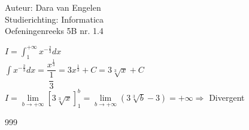 \documentclass[a4paper]{article}
\begin{document}
	
\noindent \large Auteur: Dara van Engelen     \\
\noindent \large Studierichting: Informatica \\
\noindent \large Oefeningenreeks 5B nr. 1.4  \\
	
\medskip
	
\normalsize
	
$ I = \displaystyle\int_1^{+\infty} x^{-\tfrac{2}{3}} dx $\\
	
$\displaystyle\int x^{-\tfrac{2}{3}}dx = \dfrac{x^{\tfrac{1}{3}}}{\dfrac{1}{3}} = 3x^{\tfrac{1}{3}} + C = 3\sqrt[3]{x} + C$\\

	
$ I = \lim\limits_{b\rightarrow +\infty} \left[ 3\sqrt[3]{x} \right]_1^b = \lim\limits_{b\rightarrow +\infty} \left( 3\sqrt[3]{b} -3\right) = +\infty \Rightarrow$ Divergent\\
	
\begin{thebibliography}{999}
\end{thebibliography}
\end{document}
